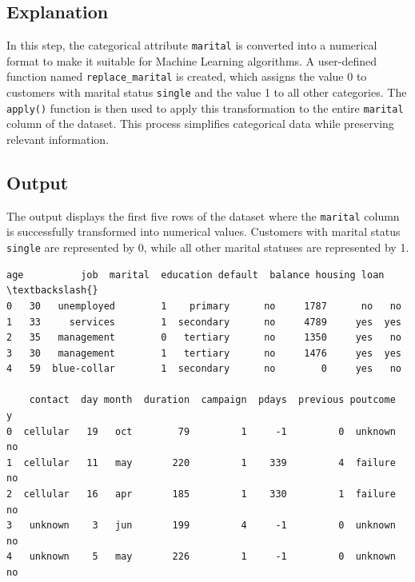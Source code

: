 \documentclass[11pt]{article}
\makeatletter
\newcommand{\boxspacing}{\kern\kvtcb@left@rule\kern\kvtcb@boxsep}
\newcommand{\prompt}[4]{
        {\ttfamily\llap{{\color{#2}[#3]:\hspace{3pt}#4}}\vspace{-\baselineskip}}
    }
\makeatother
\begin{document}
\subsection*{Explanation}
In this step, the categorical attribute \texttt{marital} is converted into a numerical format to make it suitable for Machine Learning algorithms. A user-defined function named \texttt{replace\_marital} is created, which assigns the value 0 to customers with marital status \texttt{single} and the value 1 to all other categories. The \texttt{apply()} function is then used to apply this transformation to the entire \texttt{marital} column of the dataset. This process simplifies categorical data while preserving relevant information.

\subsection*{Output}
The output displays the first five rows of the dataset where the \texttt{marital} column is successfully transformed into numerical values. Customers with marital status \texttt{single} are represented by 0, while all other marital statuses are represented by 1.
            \begin{tcolorbox}[breakable, size=fbox, boxrule=.5pt, pad at break*=1mm, opacityfill=0]
\prompt{Out}{outcolor}{5}{\boxspacing}
\begin{Verbatim}[commandchars=\\\{\}]
   age          job  marital  education default  balance housing loan  \textbackslash{}
0   30   unemployed        1    primary      no     1787      no   no
1   33     services        1  secondary      no     4789     yes  yes
2   35   management        0   tertiary      no     1350     yes   no
3   30   management        1   tertiary      no     1476     yes  yes
4   59  blue-collar        1  secondary      no        0     yes   no

    contact  day month  duration  campaign  pdays  previous poutcome   y
0  cellular   19   oct        79         1     -1         0  unknown  no
1  cellular   11   may       220         1    339         4  failure  no
2  cellular   16   apr       185         1    330         1  failure  no
3   unknown    3   jun       199         4     -1         0  unknown  no
4   unknown    5   may       226         1     -1         0  unknown  no
\end{Verbatim}
\end{tcolorbox}
        
\end{document}
